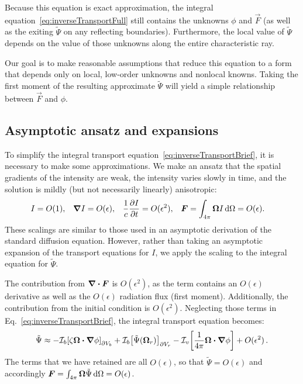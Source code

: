 Because this equation is exact approximation,
the integral equation~\eqref{eq:inverseTransportFull} still contains
the unknowns $\phi$ and $\vec{F}$ (as well as the exiting $\tilde\Psi$ on
any reflecting boundaries). Furthermore, the local value of
$\tilde\Psi$ depends on the value of those unknowns along the entire
characteristic ray.

Our goal is to make reasonable assumptions that reduce this equation to 
a form that depends only on local, low-order unknowns and nonlocal
knowns. Taking the first moment of the resulting approximate $\tilde\Psi$ will
yield a simple relationship between $\vec{F}$ and $\phi$.

\subsection{Asymptotic ansatz and expansions}
To simplify the integral transport
equation~\eqref{eq:inverseTransportBrief}, it is necessary to make some
approximations. We make an ansatz that the spatial gradients of the intensity
are weak, the intensity varies slowly in time, and the solution is mildly
(but not necessarily linearly) anisotropic:
\begin{align} \label{eq:ansatz}
  I &= O(1), &
  \bm{\nabla} I &= O(\epsilon), &
  \frac{1}{c}\frac{\partial I}{\partial t} &= O(\epsilon^2), &
  \bm{F} = \int_{4\pi} \bm{\Omega} I\mathop{}\!\mathrm{d}\Omega &= O(\epsilon).
\end{align}
These scalings are similar to those used in an asymptotic derivation of the
standard diffusion equation. However, rather than taking an asymptotic expansion
of the transport equations for $I$, we apply the scaling to the integral
equation for $\tilde\Psi$.

The contribution from $\bm{\nabla} \bm{\cdot}\bm{F}$ is $O(\epsilon^2)$, as the term
contains an $O(\epsilon)$ derivative as well as the $O(\epsilon)$ radiation
flux (first moment). Additionally, the contribution from the initial condition is
$O(\epsilon^2)$. Neglecting those terms in Eq.~\eqref{eq:inverseTransportBrief},
the integral transport equation becomes:
\begin{equation} \label{eq:approxPsi1}
  \tilde\Psi \approx 
  -\mathcal{I}_{b}\!\left[\zeta \bm{\Omega}\bm{\cdot} \bm{\nabla} \phi\right]_{\partial V_b}
  + \mathcal{I}_{b}\!\left[\tilde\Psi(\bm{\Omega}_r)\right]_{\partial V_r}
  - \mathcal{I}_{v}\!\left[\frac{1}{4\pi} \bm{\Omega}\bm{\cdot} \bm{\nabla} \phi\right]
  + O(\epsilon^2)\,.
\end{equation}
The terms that we have retained are all $O(\epsilon)$, so that $\tilde\Psi =
O(\epsilon)$ and accordingly $\bm{F} = \int_{4\pi} \bm{\Omega} \tilde\Psi
\mathop{}\!\mathrm{d}\Omega = O(\epsilon)$.

